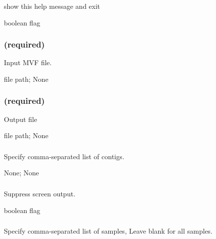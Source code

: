 \documentclass[letterpaper,11pt,english]{sphinxmanual}
\begin{document}
\subsubsection{}
\label{\detokenize{prog_desc:id52}}
 show this help message and exit

 boolean flag


\subsubsection{ (required)}
\label{\detokenize{prog_desc:id53}}
 Input MVF file.

 file path;  None


\subsubsection{ (required)}
\label{\detokenize{prog_desc:id54}}
 Output file

 file path;  None


\subsubsection{}
\label{\detokenize{prog_desc:id55}}
 Specify comma-separated list of contigs.

 None;  None


\subsubsection{}
\label{\detokenize{prog_desc:id56}}
 Suppress screen output.

 boolean flag


\subsubsection{}
\label{\detokenize{prog_desc:id57}}
 Specify comma-separated list of samples, Leave blank for all samples.
\end{document}
